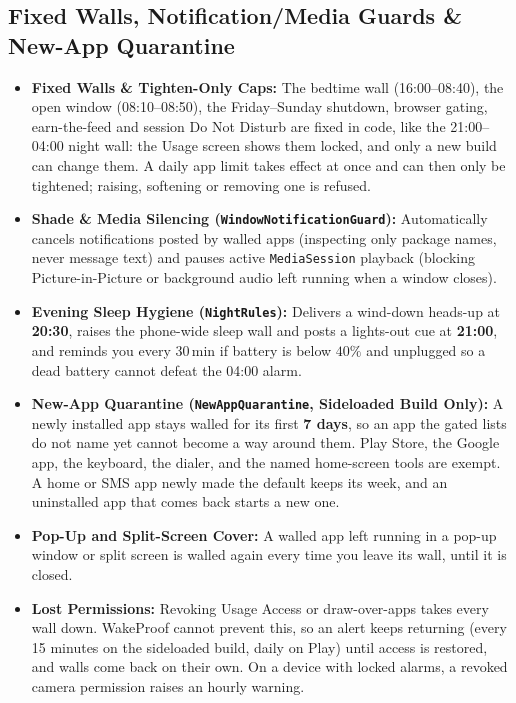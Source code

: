 \documentclass[11pt,a4paper]{article}
\begin{document}
\subsection{Fixed Walls, Notification/Media Guards \& New-App Quarantine}
\begin{itemize}
  \item \textbf{Fixed Walls \& Tighten-Only Caps:} The bedtime wall (16:00--08:40), the open window (08:10--08:50), the Friday--Sunday shutdown, browser gating, earn-the-feed and session Do Not Disturb are fixed in code, like the 21:00--04:00 night wall: the Usage screen shows them locked, and only a new build can change them. A daily app limit takes effect at once and can then only be tightened; raising, softening or removing one is refused.
  \item \textbf{Shade \& Media Silencing (\texttt{WindowNotificationGuard}):} Automatically cancels notifications posted by walled apps (inspecting only package names, never message text) and pauses active \texttt{MediaSession} playback (blocking Picture-in-Picture or background audio left running when a window closes).
  \item \textbf{Evening Sleep Hygiene (\texttt{NightRules}):} Delivers a wind-down heads-up at \textbf{20:30}, raises the phone-wide sleep wall and posts a lights-out cue at \textbf{21:00}, and reminds you every $30\,\text{min}$ if battery is below $40\%$ and unplugged so a dead battery cannot defeat the 04:00 alarm.
  \item \textbf{New-App Quarantine (\texttt{NewAppQuarantine}, Sideloaded Build Only):} A newly installed app stays walled for its first \textbf{7 days}, so an app the gated lists do not name yet cannot become a way around them. Play Store, the Google app, the keyboard, the dialer, and the named home-screen tools are exempt. A home or SMS app newly made the default keeps its week, and an uninstalled app that comes back starts a new one.
  \item \textbf{Pop-Up and Split-Screen Cover:} A walled app left running in a pop-up window or split screen is walled again every time you leave its wall, until it is closed.
  \item \textbf{Lost Permissions:} Revoking Usage Access or draw-over-apps takes every wall down. WakeProof cannot prevent this, so an alert keeps returning (every 15 minutes on the sideloaded build, daily on Play) until access is restored, and walls come back on their own. On a device with locked alarms, a revoked camera permission raises an hourly warning.
\end{itemize}
\end{document}

